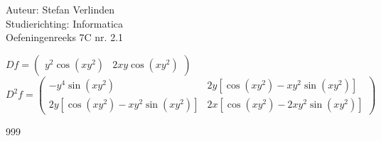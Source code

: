 \documentclass[a4paper]{article}
\begin{document}
  
\noindent \large Auteur: Stefan Verlinden \\
\noindent \large Studierichting: Informatica\\
\noindent \large Oefeningenreeks 7C nr. 2.1\\

\medskip

\normalsize

$Df = \left(
	\begin{array}{cc}
	y^2\cos(xy^2) & 2xy\cos(xy^2)
	\end{array}
\right)$\\

$D^2f = \left(
	\begin{array}{cc}
	-y^4\sin(xy^2) 					& 	2y[\cos(xy^2)-xy^2\sin(xy^2)] \\
	2y[\cos(xy^2)-xy^2\sin(xy^2)]	&	2x[\cos(xy^2)-2xy^2\sin(xy^2)]
	\end{array}
\right)$\\

\begin{thebibliography}{999}
\end{thebibliography}
\end{document}
